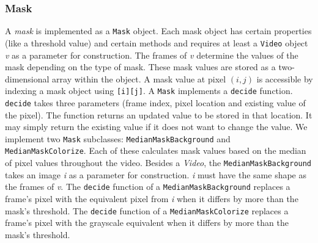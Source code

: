 \subsubsection{Mask}
\label{sec:Mask}
A \textit{mask} is implemented as a \texttt{Mask} object. Each mask object has certain properties (like a threshold value) and certain methods and requires at least a \texttt{Video} object \textit{v} as a parameter for construction. The frames of \textit{v} determine the values of the mask depending on the type of mask. These mask values are stored as a two-dimensional array within the object. A mask value at pixel $(i,j)$ is accessible by indexing a mask object using \texttt{[i][j]}. 
A \texttt{Mask} implements a \texttt{decide} function. \texttt{decide} takes three parameters (frame index, pixel location and existing value of the pixel). The function returns an updated value to be stored in that location. It may simply return the existing value if it does not want to change the value. 
We implement two \texttt{Mask} subclasses: \texttt{MedianMaskBackground} and \texttt{MedianMaskColorize}. Each of these calculates mask values based on the median of pixel values throughout the video. 
Besides a \textit{Video}, the \texttt{MedianMaskBackground} takes an image \textit{i} as a parameter for construction. \textit{i} must have the same shape as the frames of \textit{v}. The \texttt{decide} function of a \texttt{MedianMaskBackground} replaces a frame's pixel with the equivalent pixel from \textit{i} when it differs by more than the mask's threshold.
The \texttt{decide} function of a \texttt{MedianMaskColorize} replaces a frame's pixel with the grayscale equivalent when it differs by more than the mask's threshold.

